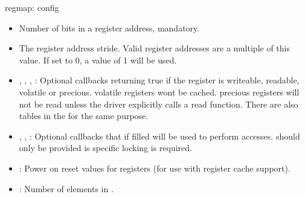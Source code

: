 \begin{frame}[fragile]{regmap: config}
  \begin{itemize}
  \item {} Number of bits in a register address, mandatory.
  \item {} The register address stride. Valid register
    addresses are a multiple of this value. If set to 0, a value of 1
    will be used.
  \item {}, ,
    , : Optional callbacks
    returning true if the register is writeable, readable, volatile or
    precious. volatile registers wont be cached. precious registers
    will not be read unless the driver explicitly calls a read
    function. There are also tables in the 
    for the same purpose.
  \item {}, , :
    Optional callbacks that if filled will be used to perform
    accesses.  should only be provided is
    specific locking is required.
  \item {}: Power on reset values for registers (for
    use with register cache support).
  \item {}: Number of elements in
    .
  \end{itemize}
\end{frame}

